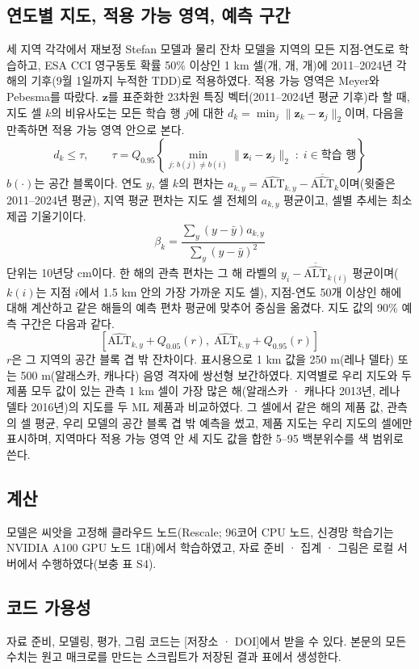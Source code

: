 \subsection{연도별 지도, 적용 가능 영역, 예측 구간}
세 지역 각각에서 재보정 Stefan 모델과 물리 잔차 모델을 지역의 모든 지점-연도로 학습하고, ESA CCI 영구동토 확률 50\% 이상인 1 km 셀(\nncellmapAk{}개, \nncellmapLe{}개, \nncellmapCa{}개)에 2011--2024년 각 해의 기후(9월 1일까지 누적한 TDD)로 적용하였다. 적용 가능 영역은 Meyer와 Pebesma\cite{MeyerPebesma2021}를 따랐다. $\mathbf{z}$를 표준화한 23차원 특징 벡터(2011--2024년 평균 기후)라 할 때, 지도 셀 $k$의 비유사도는 모든 학습 행 $j$에 대한 $d_k = \min_{j} \lVert \mathbf{z}_k - \mathbf{z}_j \rVert_2$이며, 다음을 만족하면 적용 가능 영역 안으로 본다.
\begin{equation}
d_k \leq \tau, \qquad \tau = Q_{0.95}\!\left\{ \min_{j:\, b(j) \neq b(i)} \lVert \mathbf{z}_i - \mathbf{z}_j \rVert_2 \;:\; i \in \text{학습 행} \right\}
\label{eq:aoa}
\end{equation}
$b(\cdot)$는 공간 블록이다. 연도 $y$, 셀 $k$의 편차는 $a_{k,y} = \widehat{\mathrm{ALT}}_{k,y} - \overline{\widehat{\mathrm{ALT}}}_{k}$이며(윗줄은 2011--2024년 평균), 지역 평균 편차는 지도 셀 전체의 $a_{k,y}$ 평균이고, 셀별 추세는 최소제곱 기울기이다.
\begin{equation}
\beta_k = \frac{\sum_{y} \left( y - \bar{y} \right) a_{k,y}}{\sum_{y} \left( y - \bar{y} \right)^{2}}
\label{eq:trend}
\end{equation}
단위는 10년당 cm이다. 한 해의 관측 편차는 그 해 라벨의 $y_i - \overline{\widehat{\mathrm{ALT}}}_{k(i)}$ 평균이며($k(i)$는 지점 $i$에서 1.5 km 안의 가장 가까운 지도 셀), 지점-연도 50개 이상인 해에 대해 계산하고 같은 해들의 예측 편차 평균에 맞추어 중심을 옮겼다. 지도 값의 90\% 예측 구간은 다음과 같다.
\begin{equation}
\left[ \widehat{\mathrm{ALT}}_{k,y} + Q_{0.05}(r),\; \widehat{\mathrm{ALT}}_{k,y} + Q_{0.95}(r) \right]
\label{eq:pi}
\end{equation}
$r$은 그 지역의 공간 블록 겹 밖 잔차이다. 표시용으로 1 km 값을 250 m(레나 델타) 또는 500 m(알래스카, 캐나다) 음영 격자에 쌍선형 보간하였다. 지역별로 우리 지도와 두 제품 모두 값이 있는 관측 1 km 셀이 가장 많은 해(알래스카 · 캐나다 2013년, 레나 델타 2016년)의 지도를 두 ML 제품과 비교하였다. 그 셀에서 같은 해의 제품 값, 관측의 셀 평균, 우리 모델의 공간 블록 겹 밖 예측을 썼고, 제품 지도는 우리 지도의 셀에만 표시하며, 지역마다 적용 가능 영역 안 세 지도 값을 합한 5--95 백분위수를 색 범위로 쓴다.

\subsection{계산}
모델은 씨앗을 고정해 클라우드 노드(Rescale; 96코어 CPU 노드, 신경망 학습기는 NVIDIA A100 GPU 노드 1대)에서 학습하였고, 자료 준비 · 집계 · 그림은 로컬 서버에서 수행하였다(보충 표 S4).

\subsection{코드 가용성}
자료 준비, 모델링, 평가, 그림 코드는 [저장소 · DOI]에서 받을 수 있다. 본문의 모든 수치는 원고 매크로를 만드는 스크립트가 저장된 결과 표에서 생성한다.
